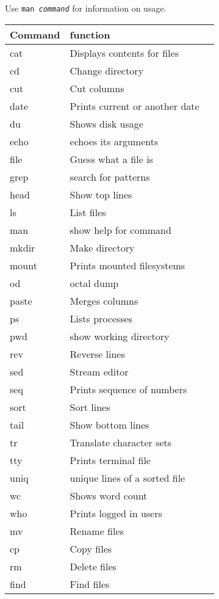 Use \texttt{man \textit{command}} for information on usage.
\begin{center}

  \begin{tabular}{l l l}
    Command & function \\
    \hline
    cat & Displays contents for files\\
    cd & Change directory \\
    cut & Cut columns \\
    date & Prints current or another date\\
    du & Shows disk usage\\
    echo & echoes its arguments \\
    file & Guess what a file is\\
    grep & search for patterns \\
    head & Show top lines \\
    ls & List files\\
    man & show help for command\\
    mkdir & Make directory \\
    mount & Prints mounted filesystems\\
    od & octal dump \\
    paste & Merges columns \\
    ps & Lists processes\\
    pwd & show working directory \\
    rev & Reverse lines \\
    sed & Stream editor \\
    seq & Prints sequence of numbers \\
    sort & Sort lines \\
    tail & Show bottom lines \\
    tr & Translate character sets \\
    tty & Prints terminal file\\
    uniq & unique lines of a sorted file \\
    wc & Shows word count\\
    who & Prints logged in users\\
    mv & Rename files \\
    cp & Copy files \\
    rm & Delete files \\
    find & Find files \\
    \end {tabular}
\end{center}
